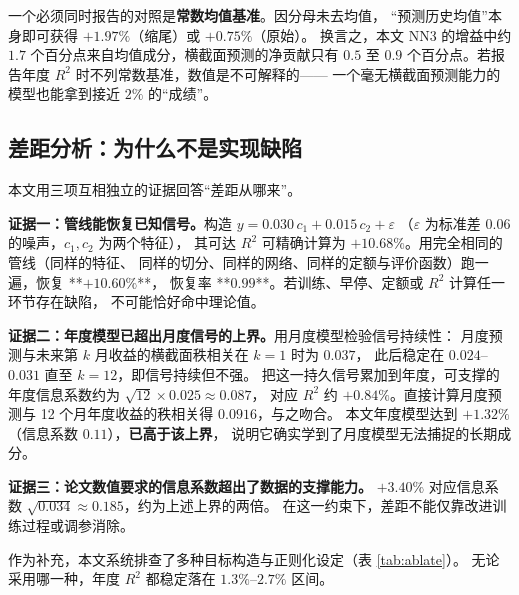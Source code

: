 \documentclass[11pt,a4paper,fontset=windows]{ctexart}
\begin{document}
一个必须同时报告的对照是\textbf{常数均值基准}。因分母未去均值，
``预测历史均值''本身即可获得 $+1.97\%$（缩尾）或 $+0.75\%$（原始）。
换言之，本文 NN3 的增益中约 $1.7$ 个百分点来自均值成分，横截面预测的净贡献只有
$0.5$ 至 $0.9$ 个百分点。若报告年度 $R^2$ 时不列常数基准，数值是不可解释的——
一个毫无横截面预测能力的模型也能拿到接近 $2\%$ 的``成绩''。

\subsection{差距分析：为什么不是实现缺陷}\label{sec:gap}

本文用三项互相独立的证据回答``差距从哪来''。

\textbf{证据一：管线能恢复已知信号。}构造 $y = 0.030\,c_1 + 0.015\,c_2 + \varepsilon$
（$\varepsilon$ 为标准差 $0.06$ 的噪声，$c_1,c_2$ 为两个特征），
其可达 $R^2$ 可精确计算为 $+10.68\%$。用完全相同的管线（同样的特征、
同样的切分、同样的网络、同样的定额与评价函数）跑一遍，恢复 **$+10.60\%$**，
恢复率 **$0.99$**。若训练、早停、定额或 $R^2$ 计算任一环节存在缺陷，
不可能恰好命中理论值。

\textbf{证据二：年度模型已超出月度信号的上界。}用月度模型检验信号持续性：
月度预测与未来第 $k$ 月收益的横截面秩相关在 $k=1$ 时为 $0.037$，
此后稳定在 $0.024$--$0.031$ 直至 $k=12$，即信号持续但不强。
把这一持久信号累加到年度，可支撑的年度信息系数约为 $\sqrt{12}\times 0.025 \approx 0.087$，
对应 $R^2$ 约 $+0.84\%$。直接计算月度预测与 12 个月年度收益的秩相关得 $0.0916$，与之吻合。
本文年度模型达到 $+1.32\%$（信息系数 $0.11$），\textbf{已高于该上界}，
说明它确实学到了月度模型无法捕捉的长期成分。

\textbf{证据三：论文数值要求的信息系数超出了数据的支撑能力。}
$+3.40\%$ 对应信息系数 $\sqrt{0.034}\approx 0.185$，约为上述上界的两倍。
在这一约束下，差距不能仅靠改进训练过程或调参消除。

作为补充，本文系统排查了多种目标构造与正则化设定（表 \ref{tab:ablate}）。
无论采用哪一种，年度 $R^2$ 都稳定落在 $1.3\%$--$2.7\%$ 区间。
\end{document}
